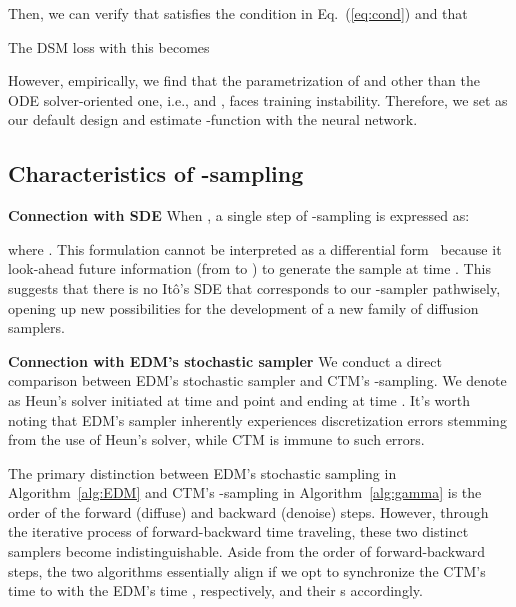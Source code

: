 \documentclass{article} \usepackage{iclr2024_coNFErence,times}
\def\eqref#1{equation~\ref{#1}}
\def\eqref#1{(\ref{#1})}
\def\eqref#1{(\ref{#1})}
\theoremstyle{definition}
\theoremstyle{remark}
\begin{document}
Then, we can verify that  satisfies the condition in Eq.~\eqref{eq:cond} and that




The DSM loss with this  becomes

However, empirically, we find that the parametrization of  and  other than the ODE solver-oriented one, i.e.,  and , faces training instability. Therefore, we set  as our default design and estimate -function with the neural network.


\subsection{Characteristics of -sampling}\label{sec:connect_sde}
 
 \textbf{Connection with SDE} When , a single step of -sampling is expressed as:

where . This formulation cannot be interpreted as a differential form~\citep{oksendal2003stochastic} because it look-ahead future information (from  to ) to generate the sample  at time . This suggests that there is no It\^o's SDE that corresponds to our -sampler pathwisely, opening up new possibilities for the development of a new family of diffusion samplers.

\textbf{Connection with EDM's stochastic sampler}\label{sec:edm_stochastic}
We conduct a direct comparison between EDM's stochastic sampler and CTM's -sampling. We denote  as Heun's solver initiated at time  and point  and ending at time . It's worth noting that EDM's sampler inherently experiences discretization errors stemming from the use of Heun's solver, while CTM is immune to such errors.

The primary distinction between EDM's stochastic sampling in Algorithm~\ref{alg:EDM} and CTM's -sampling in Algorithm~\ref{alg:gamma} is the order of the forward (diffuse) and backward (denoise) steps. However, through the iterative process of forward-backward time traveling, these two distinct samplers become indistinguishable. Aside from the order of forward-backward steps, the two algorithms essentially align if we opt to synchronize the CTM's time  to with the EDM's time , respectively, and their s accordingly. 
\end{document}
